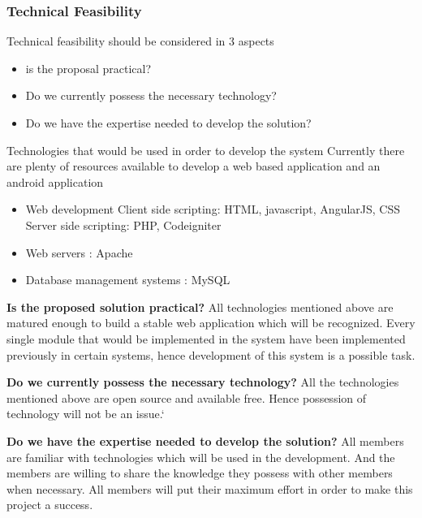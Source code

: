 \documentclass[a4paper,beamer]{article}
\begin{document}
	\subsubsection{Technical Feasibility}
	Technical feasibility should be considered in 3 aspects
	\begin{itemize}
		\item is the proposal practical?
		\item Do we currently possess the necessary technology?
		\item Do we have the expertise needed to develop the solution?
	\end{itemize}
	
	Technologies that would be used in order to develop the system
	Currently there are plenty of resources available to develop a web based application and an android application
	\begin{itemize}
		\item Web development
		Client side scripting: HTML, javascript, AngularJS, CSS
		Server side scripting: PHP, Codeigniter
		\item Web servers : Apache
		\item  Database management systems : MySQL
	\end{itemize}

	\noindent\textbf{Is the proposed solution practical?}\newline
	All technologies mentioned above are matured enough to build a stable web application which will be recognized. Every single module that would be implemented in the system have been implemented previously in certain systems, hence development of this system is a possible task.\newline
	
	\noindent\textbf{Do we currently possess the necessary technology?}\newline
	All the technologies mentioned above are open source and available free. Hence possession of technology will not be an issue.\newline`
	
	\noindent\textbf{Do we have the expertise needed to develop the solution?}\newline
	All members are familiar with technologies which will be used in the development. And the members are willing to share the knowledge they possess with other members when necessary. All members will put their maximum effort in order to make this project a success.\newline
	
\end{document}
